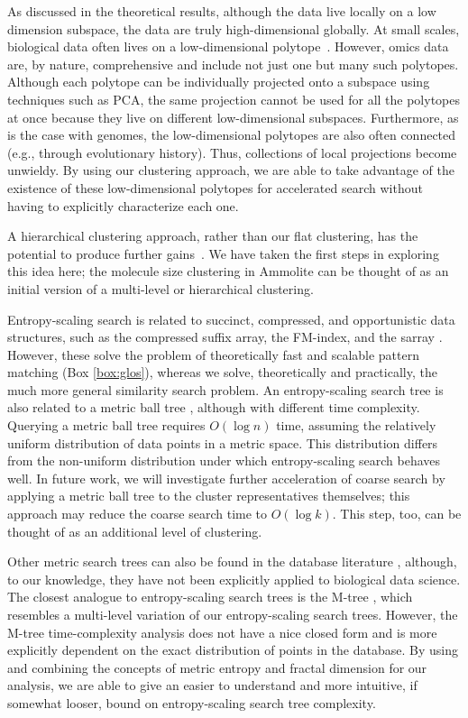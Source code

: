 \documentclass[11pt]{elsarticle}
\renewcommand{\cite}{\citep} %
\theoremstyle{definition}
\theoremstyle{remark}
\numberwithin{equation}{section}
\begin{document}
As discussed in the theoretical results, although the data live locally on a 
low dimension subspace, the data are truly high-dimensional globally.
At small scales, biological data often lives on a low-dimensional polytope~\cite{hart2015inferring}.
However, omics data are, by nature, comprehensive and include not just one but many such polytopes.
Although each polytope can be individually projected onto a subspace using techniques such as PCA, the same projection cannot be used for all the polytopes at once because they live on different low-dimensional subspaces.
Furthermore, as is the case with genomes, the low-dimensional polytopes are also often connected (e.g., through evolutionary history).
Thus, collections of local projections become unwieldy.
By using our clustering approach, we are able to take advantage of the existence of these low-dimensional polytopes for accelerated search without having to explicitly characterize each one.

A hierarchical clustering approach, rather than our flat clustering, has the
potential to produce further gains~\cite{loh2012compressive}.
We have taken the first steps in exploring this idea here; the
molecule size clustering in Ammolite can be thought of as an initial version of a multi-level or hierarchical clustering.

Entropy-scaling search is related to succinct, compressed, and opportunistic data structures, such as the compressed suffix array, the FM-index, and the sarray \cite{grossi2005compressed,ferragina2000opportunistic,conway2011succinct}.
However, these solve the problem of theoretically fast and scalable pattern matching (Box \ref{box:glos}), whereas we solve, theoretically and practically, the much more general similarity search problem.
An entropy-scaling search tree is also related to a metric ball tree \cite{uhlmann1991satisfying}, although with different time complexity.
Querying a metric ball tree requires $O(\log n)$ time, assuming the relatively uniform distribution of data points in a metric space.
This distribution differs from the non-uniform distribution under which entropy-scaling search behaves well.
In future work, we will investigate further acceleration of coarse search by applying a metric ball tree to the cluster representatives themselves; this approach may reduce the coarse search time to $O(\log k)$.
This step, too, can be thought of as an additional level of clustering.

Other metric search trees can also be found in the database literature \cite{zezula2006similarity}, although, to our knowledge, they have not been explicitly applied to biological data science.
The closest analogue to entropy-scaling search trees is the M-tree \cite{ciaccia1997deis,ciaccia1998cost}, which resembles a multi-level variation of our entropy-scaling search trees.
However, the M-tree time-complexity analysis \cite{ciaccia1998cost} does not have a nice closed form and is more explicitly dependent on the exact distribution of points in the database.
By using and combining the concepts of metric entropy and fractal dimension for our analysis, we are able to give an easier to understand and more intuitive, if somewhat looser, bound on entropy-scaling search tree complexity.
\end{document}
